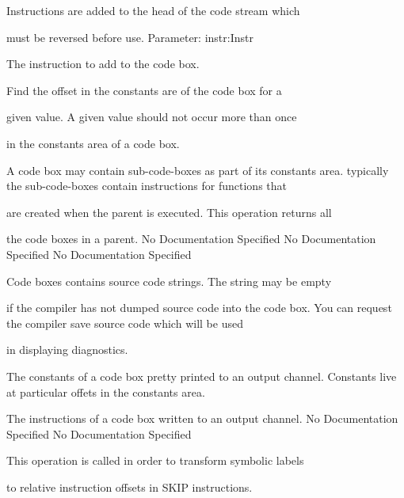           Instructions are added to the head of the code stream which

          must be reversed before use.
          Parameter: instr:Instr

            The instruction to add to the code box.

          Find the offset in the constants are of the code box for a

          given value. A given value should not occur more than once

          in the constants area of a code box.

          A code box may contain sub-code-boxes as part of its constants area.
          typically the sub-code-boxes contain instructions for functions that

          are created when the parent is executed. This operation returns all

          the code boxes in a parent.
No Documentation Specified
No Documentation Specified
No Documentation Specified

          Code boxes contains source code strings. The string may be empty

          if the compiler has not dumped source code into the code box.
          You can request the compiler save source code which will be used

          in displaying diagnostics.

          The constants of a code box pretty printed to an output channel. 
          Constants live at particular offets in the constants area.

          The instructions of a code box written to an output channel.
No Documentation Specified
No Documentation Specified

          This operation is called in order to transform symbolic labels

          to relative instruction offsets in SKIP instructions.

